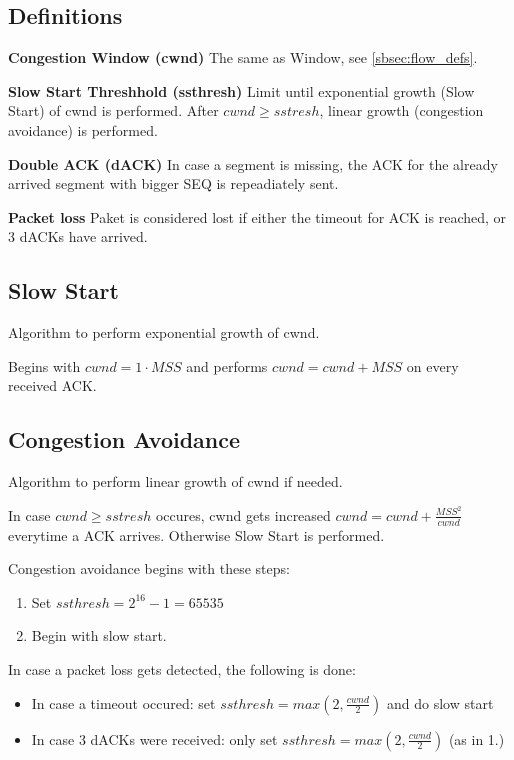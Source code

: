 \documentclass{article}
\begin{document}
\subsection{Definitions}

\textbf{Congestion Window (cwnd)}
The same as Window, see \ref{sbsec:flow_defs}.

\textbf{Slow Start Threshhold (ssthresh)}
Limit until exponential growth (Slow Start) of cwnd is performed. After $cwnd \geq sstresh$, linear growth (congestion avoidance) is performed.

\textbf{Double ACK (dACK)}
In case a segment is missing, the ACK for the already arrived segment with bigger SEQ is repeadiately sent.

\textbf{Packet loss}
Paket is considered lost if either the timeout for ACK is reached, or 3 dACKs have arrived.

\subsection{Slow Start}
Algorithm to perform exponential growth of cwnd.

Begins with $cwnd = 1 \cdot MSS$ and performs $cwnd = cwnd + MSS$ on every received ACK.

\subsection{Congestion Avoidance}
Algorithm to perform linear growth of cwnd if needed.

In case $cwnd \geq sstresh$ occures, cwnd gets increased $cwnd = cwnd + \frac{MSS^{2}}{cwnd}$ everytime a ACK arrives. Otherwise Slow Start is performed.

Congestion avoidance begins with these steps:

\begin{enumerate}
     \item Set $ssthresh = 2^{16} -1 = 65535$
     \item Begin with slow start.
\end{enumerate}

In case a packet loss gets detected, the following is done:

\begin{itemize}
     \item In case a timeout occured: set $ssthresh = max(2, \frac{cwnd}{2})$ and do slow start
     \item In case 3 dACKs were received: only set $ssthresh = max(2, \frac{cwnd}{2})$ (as in 1.)
\end{itemize}
\end{document}

